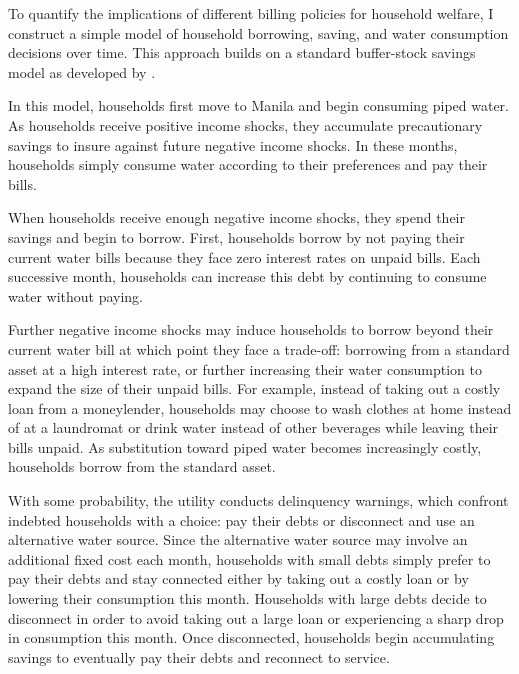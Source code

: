 \documentclass[12pt]{article}
\begin{document}

To quantify the implications of different billing policies for household welfare, I construct a simple model of household borrowing, saving, and water consumption decisions over time.  This approach builds on a standard buffer-stock savings model as developed by \cite{deaton1991saving}.

In this model, households first move to Manila and begin consuming piped water.  As households receive positive income shocks, they accumulate precautionary savings to insure against future negative income shocks.  In these months, households simply consume water according to their preferences and pay their bills.

When households receive enough negative income shocks, they spend their savings and begin to borrow.  First, households borrow by not paying their current water bills because they face zero interest rates on unpaid bills.  Each successive month, households can increase this debt by continuing to consume water without paying.

Further negative income shocks may induce households to borrow beyond their current water bill at which point they face a trade-off: borrowing from a standard asset at a high interest rate, or further increasing their water consumption to expand the size of their unpaid bills.  For example, instead of taking out a costly loan from a moneylender, households may choose to wash clothes at home instead of at a laundromat or drink water instead of other beverages while leaving their bills unpaid.  As substitution toward piped water becomes increasingly costly, households borrow from the standard asset.

With some probability, the utility conducts delinquency warnings, which confront indebted households with a choice: pay their debts or disconnect and use an alternative water source.  Since the alternative water source may involve an additional fixed cost each month, households with small debts simply prefer to pay their debts and stay connected either by taking out a costly loan or by lowering their consumption this month.  Households with large debts decide to disconnect in order to avoid taking out a large loan or experiencing a sharp drop in consumption this month.  Once disconnected, households begin accumulating savings to eventually pay their debts and reconnect to service.
\end{document}
